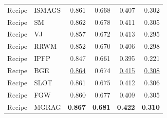 {\begin{longtable}{llrrrr}
Recipe & ISMAGS & 0.861 & 0.668 & 0.407 & 0.302 \\
Recipe & SM & 0.862 & 0.678 & 0.411 & 0.305 \\
Recipe & VJ & 0.857 & 0.672 & 0.413 & 0.295 \\
Recipe & RRWM & 0.852 & 0.670 & 0.406 & 0.298 \\
Recipe & IPFP & 0.847 & 0.661 & 0.395 & 0.221 \\
Recipe & BGE & \underline{0.864} & 0.674 & \underline{0.415} & \underline{0.308} \\
Recipe & SLOT & 0.861 & 0.675 & 0.412 & 0.306 \\
Recipe & FGW & 0.860 & 0.677 & 0.409 & 0.305 \\
Recipe & MGRAG & \textbf{0.867} & \textbf{0.681} & \textbf{0.422} & \textbf{0.310} \\
\midrule
\end{longtable}
}
